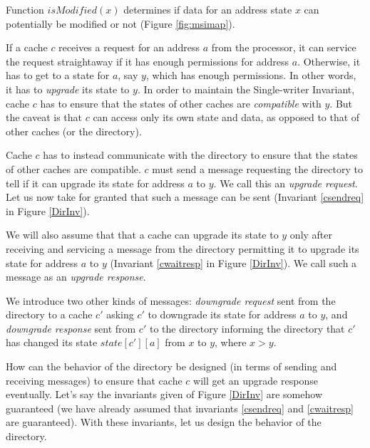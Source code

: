 Function $isModified(x)$ determines if data for an address state $x$ can
potentially be modified or not (Figure \ref{fig:msimap}).

If a cache $c$ receives a request for an address $a$ from the processor, it can
service the request straightaway if it has enough permissions for address $a$.
Otherwise, it has to get to a state for $a$, say $y$, which has enough
permissions. In other words, it has to \emph{upgrade} its state to $y$. In order
to maintain the Single-writer Invariant, cache $c$ has to
ensure that the states of other caches are \emph{compatible} with $y$. But the
caveat is that $c$ can access only its own state and data, as opposed to that of
other caches (or the directory).

Cache $c$ has to instead communicate with the directory to ensure that the
states of other caches are compatible. $c$ must send a message
 requesting the directory to tell if it can upgrade its state
for address $a$ to $y$. We call this an \emph{upgrade request}. Let us now take
for granted that such a message can be sent (Invariant \ref{csendreq} in Figure
\ref{DirInv}).

We will also assume that that a cache can upgrade its state to $y$ only after
receiving and servicing a message from the directory 
permitting it to upgrade its state for address $a$ to $y$ (Invariant
\ref{cwaitresp} in Figure \ref{DirInv}). We call such a message as an
\emph{upgrade response}.

We introduce two other kinds of messages: \emph{downgrade request}
 sent from the directory to a cache $c'$ asking $c'$ to
downgrade its state for address $a$ to $y$, and \emph{downgrade response}
 sent from $c'$ to the directory informing the directory
that $c'$ has changed its state $state[c'][a]$ from $x$ to $y$, where $x > y$.

How can the behavior of the directory be designed (in terms of sending and
receiving messages) to ensure that cache $c$ will get an upgrade response
eventually. Let's say the invariants given of Figure \ref{DirInv} are
somehow guaranteed (we have already assumed that invariants \ref{csendreq} and
\ref{cwaitresp} are guaranteed). With these invariants, let us design the
behavior of the directory.

